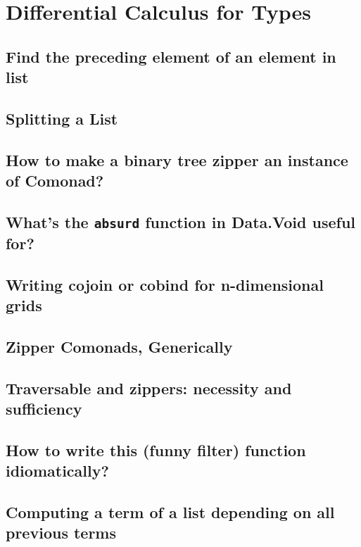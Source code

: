 \documentclass{book}
\begin{document}
\chapter{Differential Calculus for Types}

\section{Find the preceding element of an element in list}


\section{Splitting a List}


\section{How to make a binary tree zipper an instance of Comonad?}


\section{What's the {\tt absurd} function in Data.Void useful for?}


\section{Writing cojoin or cobind for n-dimensional grids}


\section{Zipper Comonads, Generically}


\section{Traversable and zippers: necessity and sufficiency}


\section{How to write this (funny filter) function idiomatically?}


\section{Computing a term of a list depending on all previous terms}

\end{document}
